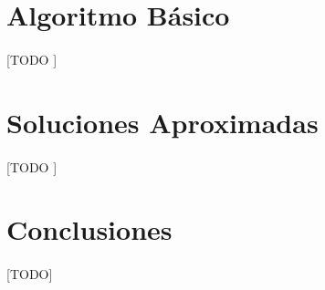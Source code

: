 \documentclass{subfiles}
\begin{document}
    \section{Algoritmo Básico}
    \label{sec:pagerank_algorithm}

      \paragraph{}
      [TODO ]

    \section{Soluciones Aproximadas}
    \label{sec:pagerank_algorithm_approximated}

      \paragraph{}
      [TODO ]

    \section{Conclusiones}
    \label{sec:pagerank_conclusions}

      \paragraph{}
      [TODO]
\end{document}
